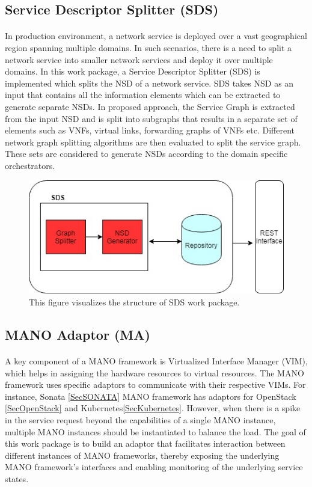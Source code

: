 \subsection{Service Descriptor Splitter (SDS)}
\paragraph{}

In production environment, a network service is deployed over a vast geographical region spanning multiple domains. In such scenarios, there is a need to split a network service into smaller network services and deploy it over multiple domains. In this work package, a Service Descriptor Splitter (SDS) is implemented which splits the NSD of a network service. SDS takes NSD as an input that contains all the information elements which can be extracted to generate separate NSDs. In proposed approach, the Service Graph is extracted from the input NSD and is split into subgraphs that results in a separate set of elements such as VNFs, virtual links, forwarding graphs of VNFs etc. Different network graph splitting algorithms are then evaluated to split the service graph. These sets are considered to generate NSDs according to the domain specific orchestrators.

\begin{figure}[h]
	\centering
	\includegraphics[width=0.7\linewidth]{figures/Splitter_Diagram}
	\caption{This figure visualizes the structure of SDS work package.}
	\label{fig:splitter_Diagram}
\end{figure}

\subsection{MANO Adaptor (MA)}
\paragraph{}

A key component of a MANO framework is Virtualized Interface Manager (VIM),  which helps in assigning the hardware resources to virtual resources. The MANO framework uses specific adaptors to communicate with their respective VIMs. For instance, Sonata \ref{SecSONATA} MANO framework has adaptors for OpenStack \ref{SecOpenStack} and Kubernetes\ref{SecKubernetes}. However, when there is a spike in the service request beyond the capabilities of a single MANO instance, multiple MANO instances should be instantiated to balance the load. The goal of this work package is to build an adaptor that facilitates interaction between different instances of MANO frameworks, thereby exposing the underlying MANO framework's interfaces and enabling monitoring of the underlying service states.


